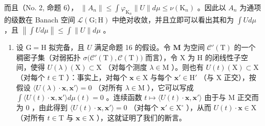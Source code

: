 而且（No. 2, 命题 6）， \(\| A_n\| \leqslant \int \varphi_{\mathrm{K}_n}\| U\| d\mu \leqslant \nu (\mathrm{K}_n)\) 。因此以 \(A_{n}\) 为通项的级数在 Banach 空间 \(\mathcal{L}(\mathrm{G};\mathrm{H})\) 中绝对收敛，并且立即可以看出其和为 \(\int Ud\mu\) ，且 \(\left\| \int Ud\mu \right\| \leqslant \int \| U\| d\mu\) 。

\begin{enumerate}
\def\labelenumi{\arabic{enumi})}
\setcounter{enumi}{1}
\tightlist
\item
  设 \(\mathrm{G} = \mathrm{H}\) 拟完备，且 \(U\) 满足命题 16 的假设。令 \(\mathbf{M}\) 为空间 \(\mathcal{C}'(\mathrm{T})\) 的一个稠密子集（对弱拓扑 \(\sigma\big(\mathcal{C}'(\mathrm{T}),\mathcal{C}(\mathrm{T})\big)\) 而言），令 \(\mathrm{X}\) 为 \(\mathrm{H}\) 的闭线性子空间，使得 \(U(\lambda)(\mathrm{X})\subset \mathrm{X}\) （对每个测度 \(\lambda \in \mathrm{M}\) ）。则也有 \(U(t)(\mathrm{X})\subset \mathrm{X}\) （对每个 \(t\in \mathrm{T}\) ）：事实上，对每个 \(\mathbf{x}\in \mathrm{X}\) 与每个 \(\mathbf{x}'\in \mathrm{H}'\) （与 \(\mathrm{X}\) 正交），按假设 \(\langle U(\lambda)\cdot \mathbf{x},\mathbf{x}'\rangle = 0\) （对所有 \(\lambda \in \mathrm{M}\) ），它可以写成 \(\int \langle U(t)\cdot \mathbf{x},\mathbf{x}'\rangle d\mu (t) = 0\) 。连续函数 \(t\mapsto \langle U(t)\cdot \mathbf{x},\mathbf{x}'\rangle\) 由于与 \(\mathrm{M}\) 正交而为 0 ，由此得到 \(\langle U(t)\cdot \mathbf{x},\mathbf{x}'\rangle = 0\) （对每个 \(\mathbf{x}'\in \mathrm{X}^\circ\) ），从而 \(U(t)\cdot \mathbf{x}\in \mathrm{X}\) （对所有 \(t\in \mathrm{T}\) 与 \(\mathbf{x}\in \mathrm{X}\) ），这就证明了我们的断言。
\end{enumerate}

